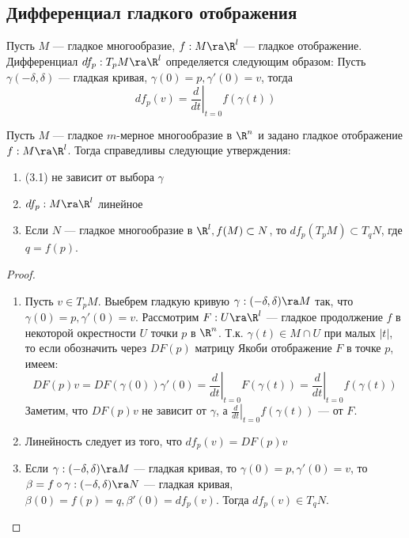 
\subsection{Дифференциал гладкого отображения}
\begin{definition}
    Пусть \(M\) --- гладкое многообразие, \(f: M \ra \R^l\) --- гладкое отображение. Дифференциал \(df_p: T_pM \ra \R^l\) определяется следующим образом:
    Пусть \(\gamma(-\delta, \delta)\) --- гладкая кривая, \(\gamma(0) = p, \gamma'(0) = v\), тогда 
    \begin{equation}
        df_p(v) = \left.\frac{d}{dt}\right|_{t = 0}f(\gamma(t))
    \end{equation}
\end{definition}

\begin{theorem}
    Пусть \(M\) --- гладкое \(m\)-мерное многообразие в \(\R^n\) и задано гладкое отображение \(f: M \ra \R^l\). Тогда справедливы следующие утверждения:
    \begin{enumerate}
        \item (3.1) не зависит от выбора \(\gamma\)
        \item \(df_p: M \ra \R^l\) линейное
        \item Если \(N\) --- гладкое многообразие в \(\R^l, f(M) \subset N\), то \(df_p(T_pM) \subset T_qN\), где \(q = f(p)\).
    \end{enumerate}
\end{theorem}
\begin{proof}\indent
    \begin{enumerate}
        \item Пусть \(v \in T_pM\). Выебрем гладкую кривую \(\gamma: (-\delta, \delta) \ra M\) так, что \(\gamma(0) = p, \gamma'(0) = v\). Рассмотрим \(F: U \ra \R^l\) --- гладкое продолжение \(f\) в некоторой окрестности \(U\) точки \(p\) в \(\R^n\). Т.к. \(\gamma(t) \in M \cap U\) при малых \(|t|\), то если обозначить через \(DF(p)\) матрицу Якоби отображение \(F\) в точке \(p\), имеем:
        \[DF(p)v = DF(\gamma(0))\gamma'(0) = \left.\frac{d}{dt}\right|_{t = 0}F(\gamma(t)) = \left.\frac{d}{dt}\right|_{t = 0}f(\gamma(t))\]
        Заметим, что \(DF(p)v\) не зависит от \(\gamma\), а \(\left.\frac{d}{dt}\right|_{t = 0}f(\gamma(t))\) --- от \(F\).

        \item Линейность следует из того, что \(df_p(v) = DF(p)v\)
        \item Если \(\gamma: (-\delta, \delta) \ra M\) --- гладкая кривая, то \(\gamma(0) = p, \gamma'(0) = v\), то \(\beta = f \circ \gamma: (-\delta, \delta) \ra N\) --- гладкая кривая, \(\beta(0) = f(p) = q, \beta'(0) = df_p(v)\). Тогда \(df_p(v) \in T_qN\).
    \end{enumerate}
\end{proof}

